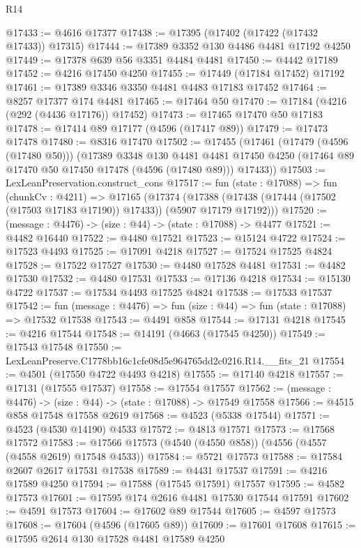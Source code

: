 \begin{lexlean}{R14}
\begin{coremodule}
@17433 := @4616 @17377
@17438 := @17395 (@17402 (@17422 (@17432 @17433)) @17315)
@17444 := @17389 @3352 @130 @4486 @4481 @17192 @4250
@17449 := @17378 @639 @56 @3351 @4484 @4481
@17450 := @4442 @17189
@17452 := @4216 @17450 @4250
@17455 := @17449 (@17184 @17452) @17192
@17461 := @17389 @3346 @3350 @4481 @4483 @17183 @17452
@17464 := @8257 @17377 @174 @4481
@17465 := @17464 @50
@17470 := @17184 (@4216 (@292 (@4436 @17176)) @17452)
@17473 := @17465 @17470 @50 @17183
@17478 := @17414 @89 @17177 (@4596 (@17417 @89))
@17479 := @17473 @17478
@17480 := @8316 @17470
@17502 := @17455
    (@17461
      (@17479 (@4596 (@17480 @50)))
      (@17389
        @3348
        @130
        @4481
        @4481
        @17450
        @4250
        (@17464 @89 @17470 @50 @17450 @17478 (@4596 (@17480 @89)))
        @17433))
@17503 := LexLeanPreservation.construct_cons
@17517 := fun (state : @17088) =>
  fun (chunkCv : @4211) =>
  @17165
    (@17374 (@17388 (@17438 (@17444 (@17502 (@17503 @17183 @17190)) @17433)) (@5907 @17179 @17192)))
@17520 := (message : @4476) -> (size : @44) -> (state : @17088) -> @4477
@17521 := @4482 @16440
@17522 := @4480 @17521
@17523 := @15124 @4722
@17524 := @17523 @4493
@17525 := @17091 @4218
@17527 := @17524 @17525 @4824
@17528 := @17522 @17527
@17530 := @4480 @17528 @4481
@17531 := @4482 @17530
@17532 := @4480 @17531
@17533 := @17136 @4218
@17534 := @15130 @4722
@17537 := @17534 @4493 @17525 @4824
@17538 := @17533 @17537
@17542 := fun (message : @4476) => fun (size : @44) => fun (state : @17088) => @17532 @17538
@17543 := @4491 @858
@17544 := @17131 @4218
@17545 := @4216 @17544
@17548 := @14191 (@4663 (@17545 @4250))
@17549 := @17543 @17548
@17550 := LexLeanPreserve.C1778bb16c1cfe08d5e964765dd2c0216.R14.__fits_21
@17554 := @4501 (@17550 @4722 @4493 @4218)
@17555 := @17140 @4218
@17557 := @17131 (@17555 @17537)
@17558 := @17554 @17557
@17562 := (message : @4476) -> (size : @44) -> (state : @17088) -> @17549 @17558
@17566 := @4515 @858 @17548 @17558 @2619
@17568 := @4523 (@5338 @17544)
@17571 := @4523 (@4530 @14190) @4533
@17572 := @4813 @17571
@17573 := @17568 @17572
@17583 := @17566 @17573 (@4540 (@4550 @858)) (@4556 (@4557 (@4558 @2619) @17548 @4533))
@17584 := @5721 @17573
@17588 := @17584 @2607 @2617 @17531 @17538
@17589 := @4431 @17537
@17591 := @4216 @17589 @4250
@17594 := @17588 (@17545 @17591) @17557
@17595 := @4582 @17573
@17601 := @17595 @174 @2616 @4481 @17530 @17544 @17591
@17602 := @4591 @17573
@17604 := @17602 @89 @17544
@17605 := @4597 @17573
@17608 := @17604 (@4596 (@17605 @89))
@17609 := @17601 @17608
@17615 := @17595 @2614 @130 @17528 @4481 @17589 @4250

\end{coremodule}
\end{lexlean}
